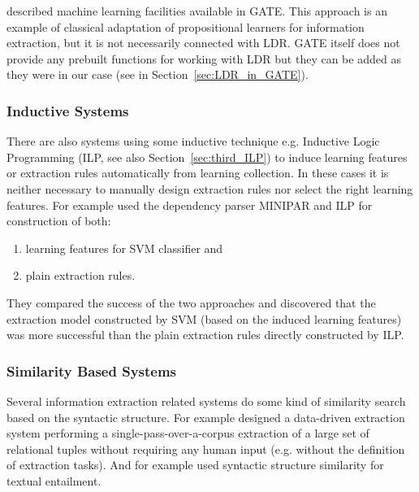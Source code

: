 \citep{Yaoyong09a} described machine learning facilities available in GATE. This approach is an example of classical adaptation of propositional learners for information extraction, but it is not necessarily connected with LDR. GATE itself does not provide any prebuilt functions for working with LDR but they can be added as they were in our case (see in Section~\ref{sec:LDR_in_GATE}). 


\subsubsection{Inductive Systems}

There are also systems using some inductive technique e.g. Inductive Logic Programming (ILP, see also Section~\ref{sec:third_ILP}) to induce learning features or extraction rules automatically from learning collection. In these cases it is neither necessary to manually design extraction rules nor select the right learning features. For example \cite{DBLP:conf/ilp/RamakrishnanJBS07} used the dependency parser MINIPAR \citep{minipar} and ILP for construction of both:
\begin{enumerate}
	\item learning features for SVM classifier and
	\item plain extraction rules.
\end{enumerate}
They compared the success of the two approaches and discovered that the extraction model constructed by SVM (based on the induced learning features) was more successful than the plain extraction rules directly constructed by ILP.


\subsubsection{Similarity Based Systems}

Several information extraction related systems do some kind of similarity search based on the syntactic structure. For example
\cite{Etzioni08informationExtraction} designed a data-driven extraction system performing a single-pass-over-a-corpus extraction of a large
set of relational tuples without requiring any human input (e.g. without the definition of extraction tasks).  And for example 
\cite{Wang:SimilarityTreeSkeletons} used syntactic structure similarity for textual entailment.

